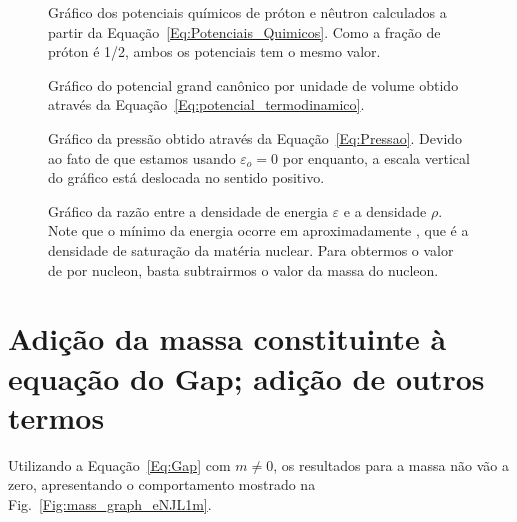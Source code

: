 \begin{figure*}
	
	\caption{Gráfico dos potenciais químicos de próton e nêutron calculados a partir da Equação~\eqref{Eq:Potenciais_Quimicos}. Como a fração de próton é 1/2, ambos os potenciais tem o mesmo valor. \protect}
	\label{Fig:chemical_potential_graph}
\end{figure*}

\begin{figure*}
	
	\caption{Gráfico do potencial grand canônico por unidade de volume obtido através da Equação~\eqref{Eq:potencial_termodinamico}. \protect}
	\label{Fig:thermodynamic_potential_graph}
\end{figure*}

\begin{figure*}
	
	\caption{Gráfico da pressão obtido através da Equação~\eqref{Eq:Pressao}. Devido ao fato de que estamos usando $\varepsilon_o = 0$ por enquanto, a escala vertical do gráfico está deslocada no sentido positivo. \protect}
	\label{Fig:pressure_graph}
\end{figure*}

\begin{figure*}
	
	\caption{Gráfico da razão entre a densidade de energia $\varepsilon$ e a densidade $\rho$. Note que o mínimo da energia ocorre em aproximadamente , que é a densidade de saturação da matéria nuclear. Para obtermos o valor de  por nucleon, basta subtrairmos o valor da massa do nucleon. \protect}
	\label{Fig:energy_by_nucleon_graph}
\end{figure*}

\FloatBarrier
\section{Adição da massa constituinte à equação do Gap; adição de outros termos}

Utilizando a Equação~\ref{Eq:Gap} com $m \neq 0$, os resultados para a massa não vão a zero, apresentando o comportamento mostrado na Fig.~\ref{Fig:mass_graph_eNJL1m}.

